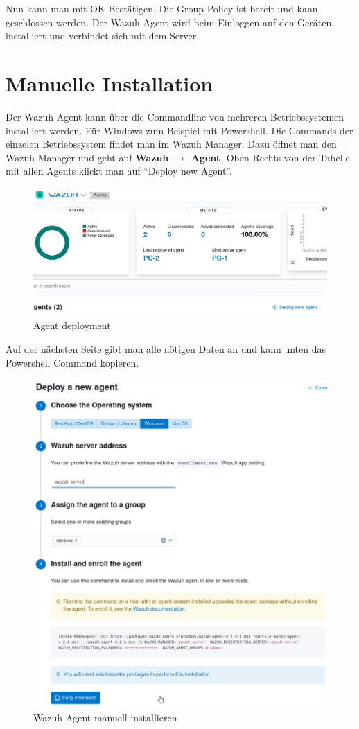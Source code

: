 Nun kann man mit OK Bestätigen.
Die Group Policy ist bereit und kann geschlossen werden.
Der Wazuh Agent wird beim Einloggen auf den Geräten installiert und verbindet sich mit dem Server.

\section{Manuelle Installation}

Der Wazuh Agent kann über die Commandline von mehreren Betriebssystemen installiert werden.
Für Windows zum Beispiel mit Powershell.
Die Commands der einzelen Betriebssystem findet man im Wazuh Manager.
Dazu öffnet man den Wazuh Manager und geht auf \textbf{Wazuh $\rightarrow$ Agent}.
Oben Rechts von der Tabelle mit allen Agents klickt man auf ``Deploy new Agent''.
\begin{figure}[H]
    \centering
    \includegraphics[width=0.7\linewidth]{../img/agent/deploy-new-agent.png}
    \caption{Agent deployment}
\end{figure}

Auf der nächsten Seite gibt man alle nötigen Daten an und kann unten das Powershell Command kopieren.
\begin{figure}[H]
    \centering
    \includegraphics[width=0.7\linewidth]{../img/agent/deploy-new-agent-2.png}
    \caption{Wazuh Agent manuell installieren}
\end{figure}

